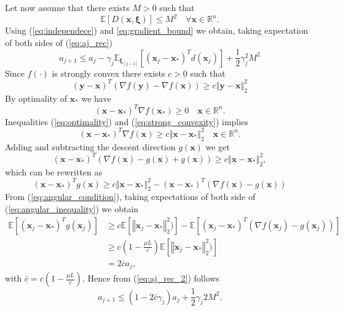 \documentclass{article}
\renewcommand{\vec}[1]{\boldsymbol{#1}}
\newcommand{\norm}[1]{\left\Vert #1 \right\Vert}
\begin{document}
Let now assume that there exists $M>0$ such that
\begin{equation}
	\mathbb{E}[D(\vec{x},\vec{\xi})]\leq M^2 \quad \forall \vec{x} \in \mathbb{R}^n.
	\label{eq:gradient_bound}
\end{equation}
Using (\ref{eq:independece}) and \ref{eq:gradient_bound} we obtain, taking expectation of both sides of (\ref{eq:aj_rec})
\begin{equation}
	a_{j+1} \leq a_j - \gamma_j\mathbb{E}_{\vec{\xi}_{[j-1]}}[(\vec{x}_j-\vec{x}_*)^Td(\vec{x}_j)] + \frac{1}{2}\gamma_j^2M^2
	\label{eq:aj_rec_2}
\end{equation}
Since $f(\cdot)$ is strongly convex there exists $c>0$ such that
\begin{equation}
	(\vec{y}-\vec{x})^T(\nabla f(\vec{y})- \nabla f(\vec{x}))\geq c \norm{\vec{y}-\vec{x}}^2_2
	\label{eq:strong_convexity}
\end{equation}
By optimality of $\vec{x}_*$ we have
\begin{equation}
	(\vec{x}-\vec{x}_*)^T\nabla f(\vec{x}_*) \geq 0 \quad \vec{x} \in \mathbb{R}^n.
	\label{eq:optimality}
\end{equation}
Inequalities (\ref{eq:optimality}) and (\ref{eq:strong_convexity}) implies
\begin{equation}
	(\vec{x}-\vec{x}_*)^T \nabla f(\vec{x}) \geq c \norm{\vec{x}-\vec{x}_*}^2_2 \quad \vec{x} \in \mathbb{R}^n.
\end{equation}
Adding and subtracting the descent direction $g(\vec{x})$ we get
\begin{equation}
	(\vec{x}-\vec{x}_*)^T (\nabla f(\vec{x}) -g(\vec{x}) +g(\vec{x})) \geq c \norm{\vec{x}-\vec{x}_*}^2_2,
\end{equation}
which can be rewritten as
\begin{equation}
		(\vec{x}-\vec{x}_*)^T g(\vec{x}) \geq c \norm{\vec{x}-\vec{x}_*}^2_2 - (\vec{x}-\vec{x}_*)^T (\nabla f(\vec{x}) -g(\vec{x}))
		\label{eq:angular_inequality}
\end{equation}
From (\ref{eq:angular_condition}), taking expectations of both side of (\ref{eq:angular_inequality}) we obtain
\begin{align}
\mathbb{E}[(\vec{x}_j-\vec{x}_*)^T g(\vec{x}_j)] &\geq c \mathbb{E}[\norm{\vec{x}_j-\vec{x}_*}^2_2)] - \mathbb{E}[(\vec{x}_j-\vec{x}_*)^T (\nabla f(\vec{x}_j) -g(\vec{x}_j))]\\
 &\geq c(1-\frac{\mu L}{c}) \mathbb{E}[\norm{\vec{x}_j-\vec{x}_*}^2_2)]\\
 & = 2\bar{c}a_j,
\end{align}
with $\bar{c}=c(1-\frac{\mu L}{c})$.
Hence from (\ref{eq:aj_rec_2}) follows 
\begin{equation}
	a_{j+1} \leq (1-2\bar{c}\gamma_j)a_j + \frac{1}{2}\gamma_j2M^2.
\end{equation}
\end{document}
